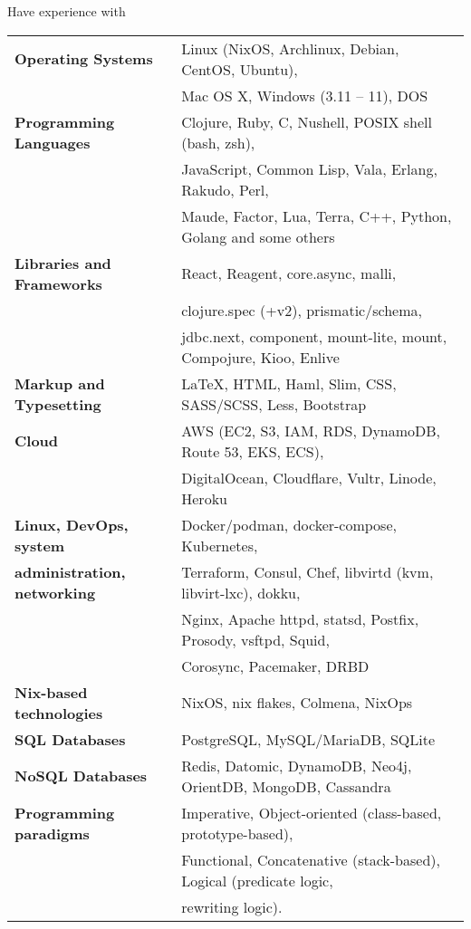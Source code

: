 \documentclass{resume} %
\begin{document}
\begin{rSection}{Have experience with}

\begin{tabular}{ @{} >{\bfseries}l @{\hspace{6ex}} l }
Operating Systems     & Linux (NixOS, Archlinux, Debian, CentOS, Ubuntu), \\
                      & Mac OS X, Windows (3.11 -- 11), DOS \smallskip \\
Programming Languages & Clojure, Ruby, C, Nushell, POSIX shell (bash, zsh), \\
                      & JavaScript, Common Lisp, Vala, Erlang, Rakudo, Perl, \\
                      & Maude, Factor, Lua, Terra, C++, Python, Golang and some others \smallskip \\
Libraries and Frameworks & React, Reagent, core.async, malli, \\
                      & clojure.spec (+v2), prismatic/schema, \\
                      & jdbc.next, component, mount-lite, mount, Compojure, Kioo, Enlive
                      \smallskip \\
Markup and Typesetting & \LaTeX, HTML, Haml, Slim, CSS, SASS/SCSS, Less, Bootstrap \smallskip \\
Cloud                 & AWS (EC2, S3, IAM, RDS, DynamoDB, Route 53, EKS, ECS), \\
                      & DigitalOcean, Cloudflare, Vultr, Linode, Heroku \smallskip \\
Linux, DevOps, system & Docker/podman, docker-compose, Kubernetes, \\
administration, networking & Terraform, Consul, Chef, libvirtd (kvm, libvirt-lxc), dokku, \\
                      & Nginx, Apache httpd, statsd, Postfix, Prosody, vsftpd, Squid, \\
                      & Corosync, Pacemaker, DRBD \smallskip \\
Nix-based technologies & NixOS, nix flakes, Colmena, NixOps \smallskip \\
SQL Databases & PostgreSQL, MySQL/MariaDB, SQLite \smallskip \\
NoSQL Databases & Redis, Datomic, DynamoDB, Neo4j, OrientDB, MongoDB, Cassandra \smallskip \\
Programming paradigms & Imperative, Object-oriented (class-based, prototype-based), \\
                      & Functional, Concatenative (stack-based), Logical (predicate logic, \\
                      & rewriting logic).
\end{tabular}

\end{rSection}
\end{document}
